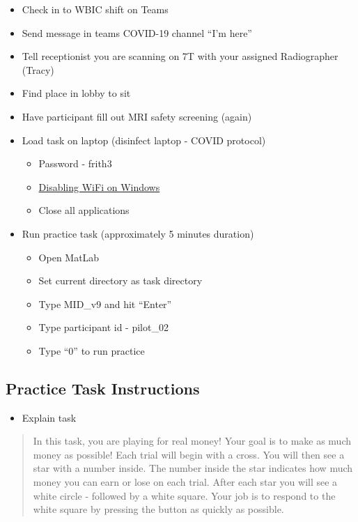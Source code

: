 \documentclass[
]{book}
\providecommand{\tightlist}{%
  \setlength{\itemsep}{0pt}\setlength{\parskip}{0pt}}
\begin{document}
\begin{itemize}
\tightlist
\item
  Check in to WBIC shift on Teams
\item
  Send message in teams COVID-19 channel ``I'm here''
\item
  Tell receptionist you are scanning on 7T with your assigned Radiographer (Tracy)
\item
  Find place in lobby to sit
\item
  Have participant fill out MRI safety screening (again)
\item
  Load task on laptop (disinfect laptop - COVID protocol)

  \begin{itemize}
  \tightlist
  \item
    Password - frith3
  \item
    \protect\hyperlink{disabling-wifi-on-windows}{Disabling WiFi on Windows}
  \item
    Close all applications
  \end{itemize}
\item
  Run practice task (approximately 5 minutes duration)

  \begin{itemize}
  \tightlist
  \item
    Open MatLab
  \item
    Set current directory as task directory
  \item
    Type MID\_v9 and hit ``Enter''
  \item
    Type participant id - pilot\_02
  \item
    Type ``0'' to run practice
  \end{itemize}
\end{itemize}

\hypertarget{practice-task-instructions}{%
\subsection{Practice Task Instructions}\label{practice-task-instructions}}

\begin{itemize}
\tightlist
\item
  Explain task
\end{itemize}

\begin{quote}
In this task, you are playing for real money! Your goal is to make as much money as possible! Each trial will begin with a cross. You will then see a star with a number inside. The number inside the star indicates how much money you can earn or lose on each trial. After each star you will see a white circle - followed by a white square. Your job is to respond to the white square by pressing the button as quickly as possible.
\end{quote}
\end{document}
